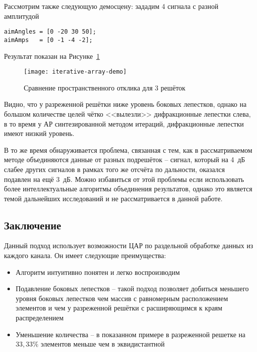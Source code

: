 Рассмотрим также следующую демосцену: зададим 4 сигнала с разной амплитудой

\begin{verbatim}
aimAngles = [0 -20 30 50];
aimAmps   = [0 -1 -4 -2];
\end{verbatim}

Результат показан на Рисунке~\ref{fig:iterative-array-demo}

\begin{figure}[!ht]
    \centering
    \texttt{[image: iterative-array-demo]}
    \caption{ Сравнение пространственного отклика для 3 решёток}%
    \label{fig:iterative-array-demo}
\end{figure}

Видно, что у разреженной решётки ниже уровень боковых лепестков, однако на большом количестве целей чётко 
<<вылезли>> дифракционные лепестки слева, в то время у АР синтезированной методом итераций, 
дифракционные лепестки имеют низкий уровень. 

В то же время обнаруживается проблема, связанная с тем, как в рассматриваемом методе объединяются данные 
от разных подрешёток -- сигнал, который на 4~дБ слабее других сигналов в рамках того же отсчёта по 
дальности, оказался подавлен на ещё 3~дБ. Можно избавиться от этой проблемы если использовать 
более интеллектуальные алгоритмы объединения результатов, однако это является 
темой дальнейших исследований и не рассматривается в данной работе.

\subsection{Заключение}

Данный подход использует возможности ЦАР по раздельной обработке данных из каждого канала. 
Он имеет следующие преимущества:

\begin{itemize}
    \item Алгоритм интуитивно понятен и легко воспроизводим
    \item Подавление боковых лепестков -- такой подход позволяет добиться меньшего уровня боковых лепестков чем массив с 
    равномерным расположением элементов и чем у разреженной решётки с расширяющимся к краям распределением
    \item Уменьшение количества -- в показанном примере в разреженной решетке на $33,33$\% элементов 
    меньше чем в эквидистантной
\end{itemize}

